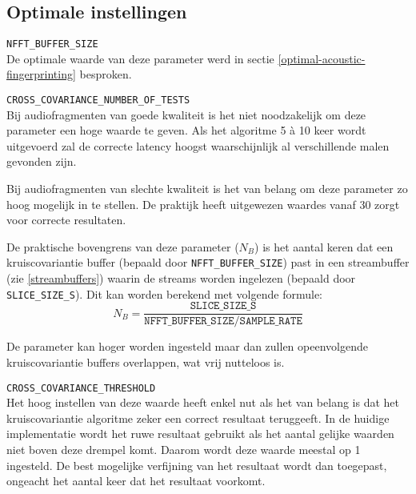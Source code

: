 \subsection{Optimale instellingen}
\begin{description}	
	\item\texttt{NFFT\_BUFFER\_SIZE} \hfill \\
	De optimale waarde van deze parameter werd in sectie \ref{optimal-acoustic-fingerprinting} besproken.
	
	\item\texttt{CROSS\_COVARIANCE\_NUMBER\_OF\_TESTS} \hfill \\
	Bij audiofragmenten van goede kwaliteit is het niet noodzakelijk om deze parameter een hoge waarde te geven. Als het algoritme 5 à 10 keer wordt uitgevoerd zal de correcte latency hoogst waarschijnlijk al verschillende malen gevonden zijn. 
	
	Bij audiofragmenten van slechte kwaliteit is het van belang om deze parameter zo hoog mogelijk in te stellen. De praktijk heeft uitgewezen waardes vanaf 30 zorgt voor correcte resultaten.
	
	De praktische bovengrens van deze parameter ($ N_B $) is het aantal keren dat een kruiscovariantie buffer (bepaald door \texttt{NFFT\_BUFFER\_SIZE}) past in een streambuffer (zie \ref{streambuffers}) waarin de streams worden ingelezen (bepaald door \texttt{SLICE\_SIZE\_S}). Dit kan worden berekend met volgende formule:
	\begin{equation}
		N_B = \frac{\texttt{SLICE\_SIZE\_S}}{\texttt{NFFT\_BUFFER\_SIZE} / \texttt{SAMPLE\_RATE}}
	\end{equation}
	
	De parameter kan hoger worden ingesteld maar dan zullen opeenvolgende kruiscovariantie buffers overlappen, wat vrij nutteloos is.
	
	\item\texttt{CROSS\_COVARIANCE\_THRESHOLD} \hfill \\
	Het hoog instellen van deze waarde heeft enkel nut als het van belang is dat het kruiscovariantie algoritme zeker een correct resultaat teruggeeft. In de huidige implementatie wordt het ruwe resultaat gebruikt als het aantal gelijke waarden niet boven deze drempel komt. Daarom wordt deze waarde meestal op 1 ingesteld. De best mogelijke verfijning van het resultaat wordt dan toegepast, ongeacht het aantal keer dat het resultaat voorkomt. 
\end{description}


